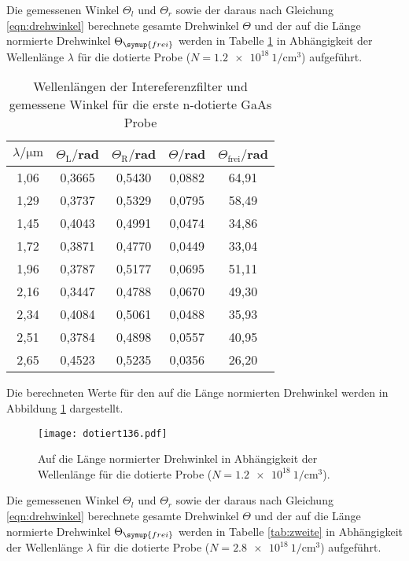 Die gemessenen Winkel $\Theta_l$ und $\Theta_r$ sowie der daraus nach Gleichung
\ref{eqn:drehwinkel} berechnete gesamte Drehwinkel $\Theta$ und der auf die Länge
normierte Drehwinkel $\Theta_\symup{frei}$ werden in Tabelle \ref{tab:erste} in Abhängigkeit
der Wellenlänge $\lambda$ für die dotierte Probe ($N = \SI{1.2e18}{1\per\centi\meter^3}$) aufgeführt.

\begin{table}[H]
  \centering
  \caption{Wellenlängen der Intereferenzfilter und gemessene Winkel für die erste n-dotierte GaAs Probe}
  \label{tab:erste}
  \begin{tabular}{c c c c c}
    \toprule
    $\lambda/\mathrm{\mu m}$ & $\Theta_{\mathrm{L}}/$rad & $\Theta_{\mathrm{R}}/$rad  & $\Theta /$rad & $\Theta_{\mathrm{frei}}/$rad\\
    \midrule
    1,06  & 0,3665 & 0,5430 & 0,0882 & 64,91 \\
    1,29  & 0,3737 & 0,5329 & 0,0795 & 58,49 \\
    1,45  & 0,4043 & 0,4991 & 0,0474 & 34,86 \\
    1,72  & 0,3871 & 0,4770 & 0,0449 & 33,04 \\
    1,96  & 0,3787 & 0,5177 & 0,0695 & 51,11 \\
    2,16  & 0,3447 & 0,4788 & 0,0670 & 49,30 \\
    2,34  & 0,4084 & 0,5061 & 0,0488 & 35,93 \\
    2,51  & 0,3784 & 0,4898 & 0,0557 & 40,95 \\
    2,65  & 0,4523 & 0,5235 & 0,0356 & 26,20 \\
    \bottomrule
  \end{tabular}
\end{table}



Die berechneten Werte für den auf die Länge normierten Drehwinkel werden
in Abbildung \ref{fig:rein} dargestellt.
\begin{figure}[H]
  \centering
  \texttt{[image: dotiert136.pdf]}
  \caption{Auf die Länge normierter Drehwinkel in Abhängigkeit der Wellenlänge für die dotierte Probe ($N = \SI{1.2e18}{1\per\centi\meter^3}$).}
  \label{fig:rein}
\end{figure}

Die gemessenen Winkel $\Theta_l$ und $\Theta_r$ sowie der daraus nach Gleichung
\ref{eqn:drehwinkel} berechnete gesamte Drehwinkel $\Theta$ und der auf die Länge
normierte Drehwinkel $\Theta_\symup{frei}$ werden in Tabelle \ref{tab:zweite} in Abhängigkeit
der Wellenlänge $\lambda$ für die dotierte Probe ($N = \SI{2.8e18}{1\per\centi\meter^3}$) aufgeführt.

